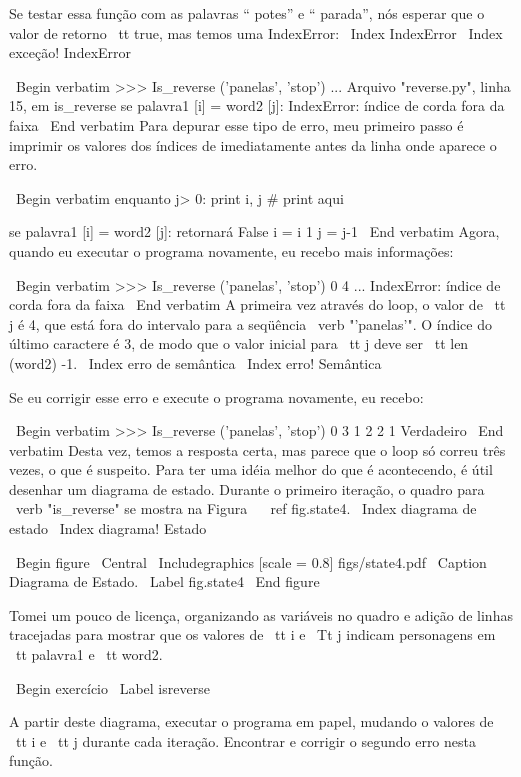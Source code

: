 \documentclass[10pt]{book}
\begin{document}
{{{{{{Se testar essa função com as palavras `` potes'' e `` parada'', nós
esperar que o valor de retorno {\ tt true}, mas temos uma IndexError:
\ Index {} IndexError
\ Index {exceção! IndexError}

\ Begin {verbatim}
>>> Is_reverse ('panelas', 'stop')
...
  Arquivo "reverse.py", linha 15, em is_reverse
    se palavra1 [i] = word2 [j]:
IndexError: índice de corda fora da faixa
\ End {verbatim}
%
Para depurar esse tipo de erro, meu primeiro passo é
imprimir os valores dos índices de imediatamente antes da linha
onde aparece o erro.

\ Begin {verbatim}
    enquanto j> 0:
        print i, j # print aqui
        
        se palavra1 [i] = word2 [j]:
            retornará False
        i = i 1
        j = j-1
\ End {verbatim}
%
Agora, quando eu executar o programa novamente, eu recebo mais informações:

\ Begin {verbatim}
>>> Is_reverse ('panelas', 'stop')
0 4
...
IndexError: índice de corda fora da faixa
\ End {verbatim}
%
A primeira vez através do loop, o valor de {\ tt j} é 4,
que está fora do intervalo para a seqüência \ verb "'panelas'".
O índice do último caractere é 3, de modo que o
valor inicial para {\ tt j} deve ser {\ tt len ​​(word2) -1}.
\ Index {erro de semântica}
\ Index {erro! Semântica}

Se eu corrigir esse erro e execute o programa novamente, eu recebo:

\ Begin {verbatim}
>>> Is_reverse ('panelas', 'stop')
0 3
1 2
2 1
Verdadeiro
\ End {verbatim}
%
Desta vez, temos a resposta certa, mas parece que o loop só correu
três vezes, o que é suspeito. Para ter uma idéia melhor do que é
acontecendo, é útil desenhar um diagrama de estado. Durante o primeiro
iteração, o quadro para \ verb "is_reverse" se mostra na Figura ~ \ ref {} fig.state4.
\ Index {diagrama de estado}
\ Index {diagrama! Estado}

\ Begin {figure}
\ Central
{\ Includegraphics [scale = 0.8] {figs/state4.pdf}}
\ Caption {Diagrama de Estado.}
\ Label {} fig.state4
\ End {figure}


Tomei um pouco de licença, organizando as variáveis ​​no quadro
e adição de linhas tracejadas para mostrar que os valores de {\ tt i} e
{\ Tt j} indicam personagens em {\ tt palavra1} e {\ tt word2}.

\ Begin {} exercício
\ Label {} isreverse

A partir deste diagrama, executar o programa em papel, mudando o
valores de {\ tt i} e {\ tt j} durante cada iteração. Encontrar e corrigir o
segundo erro nesta função.

}}}}}}
\end{document}
